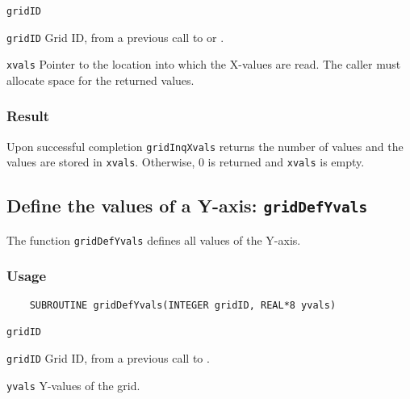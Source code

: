 \hspace*{4mm}\begin{minipage}[]{15cm}
\begin{deflist}{\texttt{gridID}\ }
\item[\texttt{gridID}]
Grid ID, from a previous call to {} or {}.
\item[\texttt{xvals}]
Pointer to the location into which the X-values are read.
                    The caller must allocate space for the returned values.

\end{deflist}
\end{minipage}

\subsubsection*{Result}

Upon successful completion {\texttt{gridInqXvals}} returns the number of values and
the values are stored in {\texttt{xvals}}.
Otherwise, 0 is returned and {\texttt{xvals}} is empty.



\subsection{Define the values of a Y-axis: \texttt{gridDefYvals}}
\label{gridDefYvals}

The function {\texttt{gridDefYvals}} defines all values of the Y-axis.

\subsubsection*{Usage}

\begin{verbatim}
    SUBROUTINE gridDefYvals(INTEGER gridID, REAL*8 yvals)
\end{verbatim}

\hspace*{4mm}\begin{minipage}[]{15cm}
\begin{deflist}{\texttt{gridID}\ }
\item[\texttt{gridID}]
Grid ID, from a previous call to {}.
\item[\texttt{yvals}]
Y-values of the grid.

\end{deflist}
\end{minipage}



